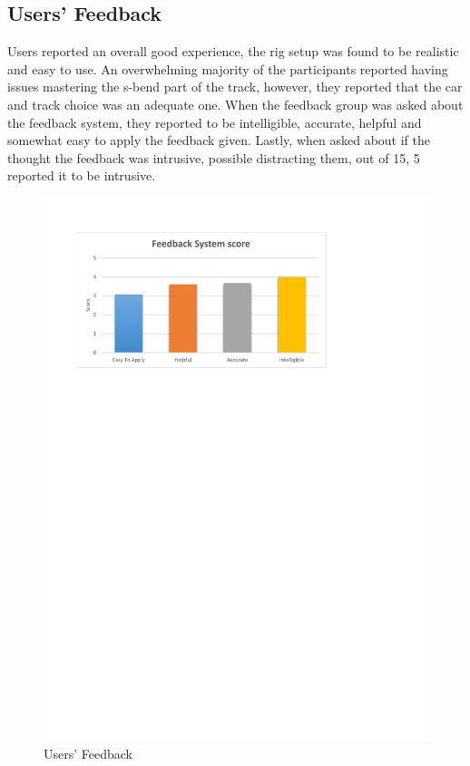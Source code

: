 \subsection{Users' Feedback}
\label{sec:eval-usersFeedback}

Users reported an overall good experience, the rig setup was found to be realistic and easy to use. An overwhelming majority of the participants reported having issues mastering the s-bend part of the track, however, they reported that the car and track choice was an adequate one. When the feedback group was asked about the feedback system, they reported to be intelligible, accurate, helpful and somewhat easy to apply the feedback given. Lastly, when asked about if the thought the feedback was intrusive, possible distracting them, out of 15, 5 reported it to be intrusive.

\begin{figure}[!htb]
	\centering
	\includegraphics[width=\textwidth]{charts/feedbacksystemfeedback.pdf}
	\caption[feedback system feedback]{Users' Feedback}
	\label{fig:chart-feedbacksystemfeedback}
\end{figure}

